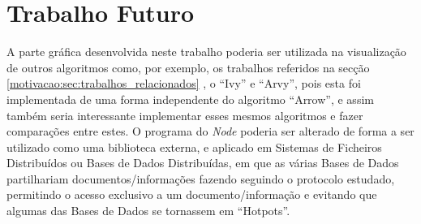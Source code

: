 \section{Trabalho Futuro}
\label{sec:trab-futuro}
A parte gráfica desenvolvida neste trabalho poderia ser utilizada na visualização de outros algoritmos como, por exemplo, os trabalhos referidos na secção \ref{motivacao:sec:trabalhos_relacionados}
, o ``Ivy'' e ``Arvy'', pois esta foi implementada de uma forma independente do algoritmo ``Arrow'', e assim também seria interessante implementar esses mesmos algoritmos e fazer comparações entre estes.
O programa do \emph{Node} poderia ser alterado de forma a ser utilizado como uma biblioteca externa, e aplicado em Sistemas de Ficheiros Distribuídos ou Bases de Dados Distribuídas, em que as várias Bases de Dados partilhariam documentos/informações fazendo seguindo o protocolo estudado, permitindo o acesso exclusivo a um documento/informação e evitando que algumas das Bases de Dados se tornassem em ``Hotpots''.



